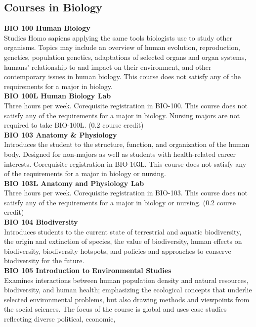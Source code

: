 \documentclass[
  letterpaper,
]{scrbook}
\begin{document}
\subsection{Courses in Biology}\label{courses-in-biology}

\textbf{BIO 100 Human Biology}\\
Studies Homo sapiens applying the same tools biologists use to study
other organisms. Topics may include an overview of human evolution,
reproduction, genetics, population genetics, adaptations of selected
organs and organ systems, humans' relationship to and impact on their
environment, and other contemporary issues in human biology. This course
does not satisfy any of the requirements for a major in biology.\\
\textbf{BIO 100L Human Biology Lab}\\
Three hours per week. Corequisite registration in BIO-100. This course
does not satisfy any of the requirements for a major in biology. Nursing
majors are not required to take BIO-100L. (0.2 course credit)\\
\textbf{BIO 103 Anatomy \& Physiology}\\
Introduces the student to the structure, function, and organization of
the human body. Designed for non-majors as well as students with
health-related career interests. Corequisite registration in BIO-103L.
This course does not satisfy any of the requirements for a major in
biology or nursing.\\
\textbf{BIO 103L Anatomy and Physiology Lab}\\
Three hours per week. Corequisite registration in BIO-103. This course
does not satisfy any of the requirements for a major in biology or
nursing. (0.2 course credit)\\
\textbf{BIO 104 Biodiversity}\\
Introduces students to the current state of terrestrial and aquatic
biodiversity, the origin and extinction of species, the value of
biodiversity, human effects on biodiversity, biodiversity hotspots, and
policies and approaches to conserve biodiversity for the future.\\
\textbf{BIO 105 Introduction to Environmental Studies}\\
Examines interactions between human population density and natural
resources, biodiversity, and human health; emphasizing the ecological
concepts that underlie selected environmental problems, but also drawing
methods and viewpoints from the social sciences. The focus of the course
is global and uses case studies reflecting diverse political, economic,
\end{document}

